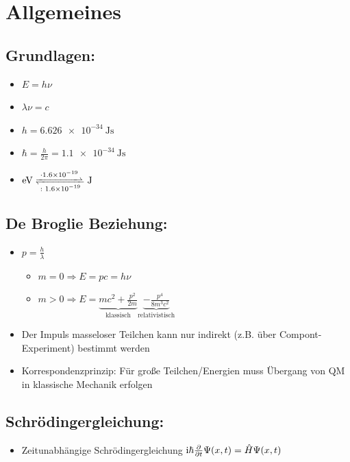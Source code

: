 \documentclass[a4paper,11pt]{article}
\newcommand{\ii}{\mathrm{i}}
\newcommand{\hb}{\hbar}
\begin{document}
\section{Allgemeines}

\subsection*{Grundlagen:}
\begin{itemize}[label=--]
    \item $ E = h \nu$
    \item $\lambda \nu = c$
    \item $h = \SI{6.626e-34}{\joule\second}$
    \item $\hbar = \frac{h}{2\pi} =\SI{1.1e-34}{\joule\second}$
    \item $\ce{\unit{\eV} <=>[\cdot \num{1.6e-19}][\colon \num{1.6e-19}] \unit{\joule}}$
\end{itemize}

\subsection*{De Broglie Beziehung:}
\begin{itemize}[label=--]
    \item $p = \frac{h}{\lambda}$
    \begin{itemize}[label= --]
        \item $m=0 \Rightarrow E = pc = h \nu$
        \item $m > 0\Rightarrow E = \underbrace{mc^2 + \frac{p^2}{2m}}_{\text{klassisch}} \underbrace{- \frac{p^4}{8m^3c^2}}_{\text{relativistisch}}$
    \end{itemize}
    \item Der Impuls masseloser Teilchen kann nur indirekt (z.B. über Compont-Experiment) bestimmt werden
    \item Korrespondenzprinzip: Für große Teilchen/Energien muss Übergang von QM in klassische Mechanik erfolgen
\end{itemize}

\subsection*{Schrödingergleichung:}

\begin{itemize}
    \item Zeitunabhängige Schrödingergleichung $ \ii \hb \pdv{}{t}\Psi(x,t) = \hat H \Psi(x,t) $
\end{itemize}
\end{document}
